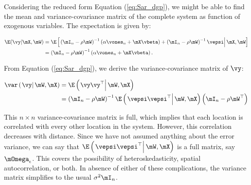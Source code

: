 \documentclass[english,12pt]{book}\usepackage[]{graphicx}\usepackage[]{xcolor}
\begin{document}
Considering the reduced form Equation (\ref{eq:Sar_dgp}), we might be able to find the mean and variance-covariance matrix of the complete system as function of exogenous variables. The expectation is given by:

\begin{equation}\label{eq:expected_value_slm}
  \begin{aligned}
\E(\vy|\mX,\mW) & = \E\left[\left.\left(\mI_n - \rho \mW\right)^{-1}\left(\alpha \vones_n + \mX\vbeta\right) + \left(\mI_n - \rho \mW\right)^{-1}\vepsi\right|\mX,\mW\right] \\
                & = \left(\mI_n - \rho \mW\right)^{-1}\left(\alpha \vones_n + \mX\vbeta\right).
\end{aligned}
\end{equation}

From Equation (\ref{eq:Sar_dgp}), we derive the variance-covariance matrix of $\vy$:

\begin{equation}
  \begin{aligned}
    \var\left(\left.\vy\right|\mW, \mX\right) & = \E\left(\left.\vy\vy^\top\right|\mW,\mX\right) \\ 
                               & = \left(\mI_n - \rho\mW\right)^{-1}\E\left(\left.\vepsi\vepsi^\top\right|\mW, \mX\right)\left(\mI_n- \rho\mW^\top\right)
  \end{aligned}
\end{equation}

This $n\times n$ variance-covariance matrix is full, which implies that each location is correlated with every other location in the system. However, this correlation decreases with distance. Since we have not assumed anything about the error variance, we can say that $\E\left(\left.\vepsi\vepsi^\top\right|\mW, \mX\right)$ is a full matrix, say $\mOmega_{\epsilon}$. This covers the possibility of heteroskedasticity, spatial autocorrelation, or both. In absence of either of these complications, the variance matrix simplifies to the usual $\sigma^2\mI_n$.
\end{document}
